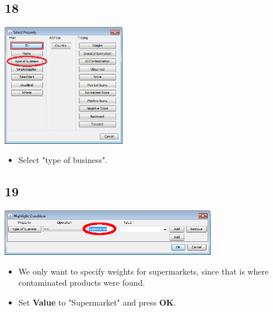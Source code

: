 \documentclass{beamer}
\begin{document}
\subsection{18}
\begin{frame}
	\begin{center}
  		\includegraphics[width=0.4\textwidth]{18.png}
	\end{center}
	\begin{itemize}
		\item Select "type of business".
	\end{itemize}
\end{frame}

\subsection{19}
\begin{frame}
	\begin{center}
  		\includegraphics[width=0.7\textwidth]{19.png}
	\end{center}
	\begin{itemize}
		\item We only want to specify weights for supermarkets, since that is where contaminated products were found.
		\item Set \textbf{Value} to "Supermarket" and press \textbf{OK}.
	\end{itemize}
\end{frame}
\end{document}
